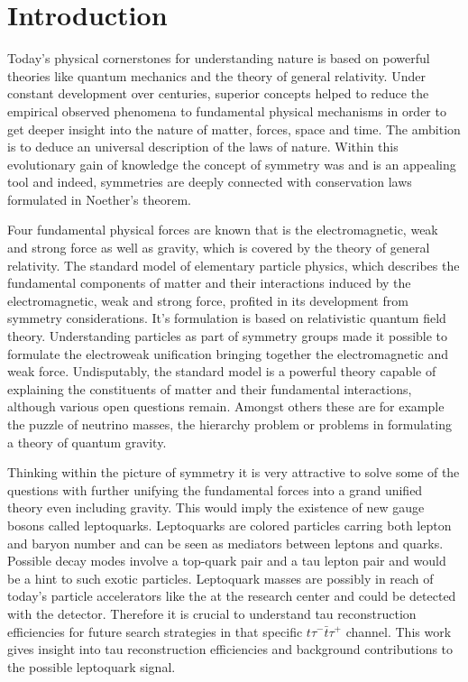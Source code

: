 \chapter{Introduction}
Today's physical cornerstones for understanding nature is based on powerful theories like quantum mechanics and the theory of general relativity. Under constant development over centuries, superior concepts helped to reduce the empirical observed phenomena to fundamental physical mechanisms in order to get deeper insight into the nature of matter, forces, space and time. The ambition is to deduce an universal description of the laws of nature. Within this evolutionary gain of knowledge the concept of symmetry was and is an appealing tool and indeed, symmetries are deeply connected with conservation laws formulated in Noether's theorem.\par
Four fundamental physical forces are known that is the electromagnetic, weak and strong force as well as gravity, which is covered by the theory of general relativity. The standard model of elementary particle physics, which describes the fundamental components of matter and their interactions induced by the electromagnetic, weak and strong force, profited in its development from symmetry considerations. It's formulation is based on relativistic quantum field theory. Understanding particles as part of symmetry groups made it possible to formulate the electroweak unification bringing together the electromagnetic and weak force. Undisputably, the standard model is a powerful theory capable of explaining the constituents of matter and their fundamental interactions, although various open questions remain. Amongst others these are for example the puzzle of neutrino masses, the hierarchy problem or problems in formulating a theory of quantum gravity.\par
Thinking within the picture of symmetry it is very attractive to solve some of the questions with further unifying the fundamental forces into a grand unified theory even including gravity. This would imply the existence of new gauge bosons called leptoquarks. Leptoquarks are colored particles carring both lepton and baryon number and can be seen as mediators between leptons and quarks. Possible decay modes involve a top-quark pair and a tau lepton pair and would be a hint to such exotic particles. Leptoquark masses are possibly in reach of today's particle accelerators like the {\LHC} at the research center {\CERN} and could be detected with the {\ATLAS} detector. Therefore it is crucial to understand tau reconstruction efficiencies for future search strategies in that specific $t\tau^-\bar{t}\tau^+$ channel. This work gives insight into tau reconstruction efficiencies and background contributions to the possible leptoquark signal.\par
